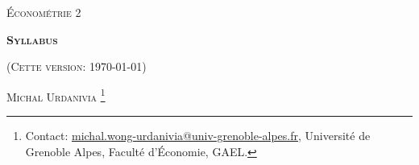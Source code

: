 


\usepackage{tikz}



\usepackage{fancyhdr}
\pagestyle{fancy}
\fancyhead{}
\fancyfoot{} 
\fancyfoot[C]{\small{\thepage}}
\renewcommand{\footrulewidth}{0pt}



 
\usetikzlibrary{positioning}
\usetikzlibrary{snakes}
\usetikzlibrary{calc}
\usetikzlibrary{arrows}
\usetikzlibrary{decorations.markings}
\usetikzlibrary{shapes.misc}
\usetikzlibrary{shapes}

\begin{titlepage}
\centering
	{\scshape\Large \textsc{Économétrie 2}\par}
	\vspace{1cm}
	{\Large\bfseries \textsc{Syllabus} \par}
    \vspace{1cm}   
	{(\textsc{Cette version: \today})\par}
	\vspace{1cm}
	{\large \textsc{Michal Urdanivia}
	\footnote{Contact:  
	\href{mailto:michal.wong-urdanivia@univ-grenoble-alpes.fr}{michal.wong-urdanivia@univ-grenoble-alpes.fr}, 
	 Université de Grenoble Alpes,  Faculté d'\'Economie, GAEL.}\par}
	
\end{titlepage}

